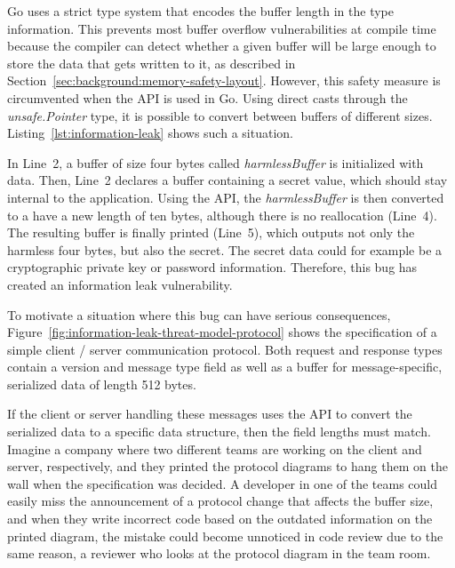 Go uses a strict type system that encodes the buffer length in the type information.
This prevents most buffer overflow vulnerabilities at compile time because the compiler can detect whether a given
buffer will be large enough to store the data that gets written to it, as described in
Section~\ref{sec:background:memory-safety-layout}.
However, this safety measure is circumvented when the \unsafe{} \acrshort{API} is used in Go.
Using direct casts through the \textit{unsafe.Pointer} type, it is possible to convert between buffers of different
sizes.
Listing~\ref{lst:information-leak} shows such a situation.



In Line~2, a buffer of size four bytes called \textit{harmlessBuffer} is initialized with data.
Then, Line~2 declares a buffer containing a secret value, which should stay internal to the application.
Using the \unsafe{} \acrshort{API}, the \textit{harmlessBuffer} is then converted to a have a new length of ten bytes,
although there is no reallocation (Line~4).
The resulting buffer is finally printed (Line~5), which outputs not only the harmless four bytes, but also the secret.
The secret data could for example be a cryptographic private key or password information.
Therefore, this bug has created an information leak vulnerability.

To motivate a situation where this bug can have serious consequences,
Figure~\ref{fig:information-leak-threat-model-protocol} shows the specification of a simple client / server
communication protocol.
Both request and response types contain a version and message type field as well as a buffer for message-specific,
serialized data of length 512 bytes.



If the client or server handling these messages uses the \unsafe{} \acrshort{API} to convert the serialized data to a
specific data structure, then the field lengths must match.
Imagine a company where two different teams are working on the client and server, respectively, and they printed the
protocol diagrams to hang them on the wall when the specification was decided.
A developer in one of the teams could easily miss the announcement of a protocol change that affects the buffer size,
and when they write incorrect code based on the outdated information on the printed diagram, the mistake could become
unnoticed in code review due to the same reason, a reviewer who looks at the protocol diagram in the team room.


